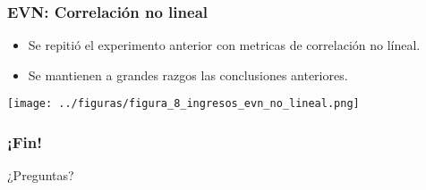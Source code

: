 \documentclass[10pt,mathserif]{beamer}%
\begin{document}
\begin{frame}
    \frametitle{EVN: Correlación no lineal}
    \begin{multicols}{2}
        \begin{minipage}{\linewidth}
            \begin{itemize}
                \item Se repitió el experimento anterior con metricas de correlación no líneal.
                \item Se mantienen a grandes razgos las conclusiones anteriores.
            \end{itemize}
        \end{minipage}
        \begin{minipage}{\linewidth}
            \centering
            \texttt{[image: ../figuras/figura\_8\_ingresos\_evn\_no\_lineal.png]} %
        \end{minipage}

    \end{multicols}

\end{frame}

\begin{frame}
\frametitle{¡Fin!}
\begin{center}
{\Huge ¿Preguntas?}

\end{center}
\end{frame}


\end{document}
